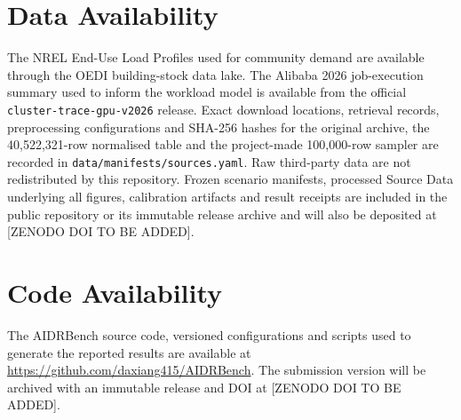 \documentclass[10pt,a4paper]{article}
\begin{document}
\section*{Data Availability}

The NREL End-Use Load Profiles used for community demand are available through the OEDI building-stock data lake. The Alibaba 2026 job-execution summary used to inform the workload model is available from the official \nolinkurl{cluster-trace-gpu-v2026} release. Exact download locations, retrieval records, preprocessing configurations and SHA-256 hashes for the original archive, the 40,522,321-row normalised table and the project-made 100,000-row sampler are recorded in \nolinkurl{data/manifests/sources.yaml}. Raw third-party data are not redistributed by this repository. Frozen scenario manifests, processed Source Data underlying all figures, calibration artifacts and result receipts are included in the public repository or its immutable release archive and will also be deposited at [ZENODO DOI TO BE ADDED].


\section*{Code Availability}

The AIDRBench source code, versioned configurations and scripts used to generate the reported results are available at \url{https://github.com/daxiang415/AIDRBench}. The submission version will be archived with an immutable release and DOI at [ZENODO DOI TO BE ADDED].


\clearpage
\end{document}
